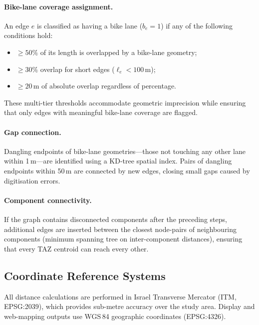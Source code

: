\documentclass[12pt,a4paper]{article}
\begin{document}
\paragraph{Bike-lane coverage assignment.}
An edge $e$ is classified as having a bike lane ($b_e = 1$) if any of the following conditions hold:
\begin{itemize}[leftmargin=*,nosep]
    \item $\geq 50\%$ of its length is overlapped by a bike-lane geometry;
    \item $\geq 30\%$ overlap for short edges ($\ell_e < 100$\,m);
    \item $\geq 20$\,m of absolute overlap regardless of percentage.
\end{itemize}
These multi-tier thresholds accommodate geometric imprecision while ensuring that only edges with meaningful bike-lane coverage are flagged.

\paragraph{Gap connection.}
Dangling endpoints of bike-lane geometries---those not touching any other lane within 1\,m---are identified using a KD-tree spatial index. Pairs of dangling endpoints within 50\,m are connected by new edges, closing small gaps caused by digitisation errors.

\paragraph{Component connectivity.}
If the graph contains disconnected components after the preceding steps, additional edges are inserted between the closest node-pairs of neighbouring components (minimum spanning tree on inter-component distances), ensuring that every TAZ centroid can reach every other.

\subsection{Coordinate Reference Systems}

All distance calculations are performed in Israel Transverse Mercator (ITM, EPSG:2039), which provides sub-metre accuracy over the study area. Display and web-mapping outputs use WGS\,84 geographic coordinates (EPSG:4326).

\end{document}
